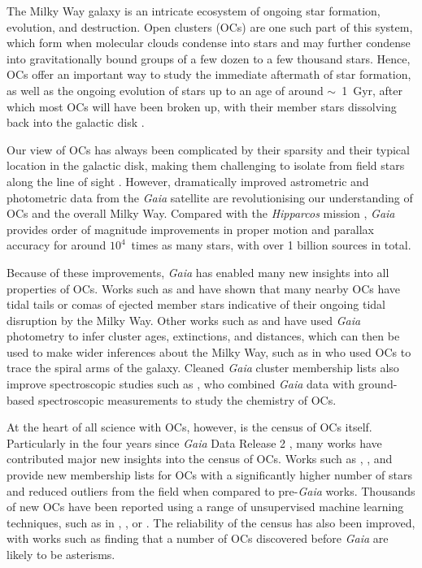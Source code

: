 The Milky Way galaxy is an intricate ecosystem of ongoing star formation, evolution, and destruction. Open clusters (OCs) are one such part of this system, which form when molecular clouds condense into stars and may further condense into gravitationally bound groups of a few dozen to a few thousand stars. Hence, OCs offer an important way to study the immediate aftermath of star formation, as well as the ongoing evolution of stars up to an age of around $\sim$~1~Gyr, after which most OCs will have been broken up, with their member stars dissolving back into the galactic disk \citep{portegies_zwart_young_2010, krumholz_star_2019, krause_physics_2020}.

Our view of OCs has always been complicated by their sparsity and their typical location in the galactic disk, making them challenging to isolate from field stars along the line of sight \citep{cantat-gaudin_milky_2022}. However, dramatically improved astrometric and photometric data from the \emph{Gaia} satellite \citep{gaia_collaboration_gaia_2016} are revolutionising our understanding of OCs and the overall Milky Way. Compared with the \emph{Hipparcos} mission \citep{perryman_hipparcos_1997}, \emph{Gaia} provides order of magnitude improvements in proper motion and parallax accuracy for around $10^4$~times as many stars, with over 1 billion sources in total.

Because of these improvements, \emph{Gaia} has enabled many new insights into all properties of OCs. Works such as \cite{meingast_extended_2021} and \cite{tarricq_structural_2022} have shown that many nearby OCs have tidal tails or comas of ejected member stars indicative of their ongoing tidal disruption by the Milky Way. Other works such as \cite{bossini_age_2019} and \cite{cantat-gaudin_painting_2020} have used \emph{Gaia} photometry to infer cluster ages, extinctions, and distances, which can then be used to make wider inferences about the Milky Way, such as in \cite{castro-ginard_milky_2021} who used OCs to trace the spiral arms of the galaxy. Cleaned \emph{Gaia} cluster membership lists also improve spectroscopic studies such as \cite{baratella_gaia-eso_2020}, who combined \emph{Gaia} data with ground-based spectroscopic measurements to study the chemistry of OCs.

At the heart of all science with OCs, however, is the census of OCs itself. Particularly in the four years since \emph{Gaia} Data Release 2 \citep[DR2,][]{brown_gaia_2018}, many works have contributed major new insights into the census of OCs. Works such as \cite{cantat-gaudin_characterising_2018}, \cite{cantat-gaudin_clusters_2020}, and \cite{jaehnig_membership_2021} provide new membership lists for OCs with a significantly higher number of stars and reduced outliers from the field when compared to pre-\emph{Gaia} works. Thousands of new OCs have been reported using a range of unsupervised machine learning techniques, such as in \cite{castro-ginard_new_2018, castro-ginard_hunting_2019, castro-ginard_hunting_2020, castro-ginard_hunting_2022}, \cite{cantat-gaudin_gaia_2019}, or \cite{liu_catalog_2019}. The reliability of the census has also been improved, with works such as \cite{cantat-gaudin_clusters_2020} finding that a number of OCs discovered before \emph{Gaia} are likely to be asterisms.


